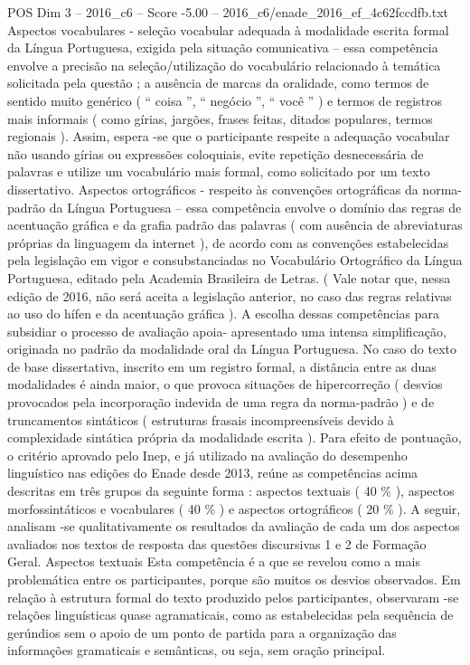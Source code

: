 \begin{textsample}{POS Dim 3 – 2016\_c6 – Score -5.00 – 2016\_c6/enade\_2016\_ef\_4c62fccdfb.txt}
Aspectos vocabulares - seleção vocabular adequada à modalidade escrita formal da Língua Portuguesa, exigida pela situação comunicativa – essa competência envolve a precisão na seleção/utilização do vocabulário relacionado à temática solicitada pela questão ; a ausência de marcas da oralidade, como termos de sentido muito genérico ( “ coisa ”, “ negócio ”, “ você ” ) e termos de registros mais informais ( como gírias, jargões, frases feitas, ditados populares, termos regionais ).
Assim, espera -se que o participante respeite a adequação vocabular não usando gírias ou expressões coloquiais, evite repetição desnecessária de palavras e utilize um vocabulário mais formal, como solicitado por um texto dissertativo.
Aspectos ortográficos - respeito às convenções ortográficas da norma-padrão da Língua Portuguesa – essa competência envolve o domínio das regras de acentuação gráfica e da grafia padrão das palavras ( com ausência de abreviaturas próprias da linguagem da internet ), de acordo com as convenções estabelecidas pela legislação em vigor e consubstanciadas no Vocabulário Ortográfico da Língua Portuguesa, editado pela Academia Brasileira de Letras. ( Vale notar que, nessa edição de 2016, não será aceita a legislação anterior, no caso das regras relativas ao uso do hífen e da acentuação gráfica ).
A escolha dessas competências para subsidiar o processo de avaliação apoia- apresentado uma intensa simplificação, originada no padrão da modalidade oral da Língua Portuguesa.
No caso do texto de base dissertativa, inscrito em um registro formal, a distância entre as duas modalidades é ainda maior, o que provoca situações de hipercorreção ( desvios provocados pela incorporação indevida de uma regra da norma-padrão ) e de truncamentos sintáticos ( estruturas frasais incompreensíveis devido à complexidade sintática própria da modalidade escrita ).
Para efeito de pontuação, o critério aprovado pelo Inep, e já utilizado na avaliação do desempenho linguístico nas edições do Enade desde 2013, reúne as competências acima descritas em três grupos da seguinte forma : aspectos textuais ( 40 \% ), aspectos morfossintáticos e vocabulares ( 40 \% ) e aspectos ortográficos ( 20 \% ).
A seguir, analisam -se qualitativamente os resultados da avaliação de cada um dos aspectos avaliados nos textos de resposta das questões discursivas 1 e 2 de Formação Geral.
Aspectos textuais Esta competência é a que se revelou como a mais problemática entre os participantes, porque são muitos os desvios observados.
Em relação à estrutura formal do texto produzido pelos participantes, observaram -se relações linguísticas quase agramaticais, como as estabelecidas pela sequência de gerúndios sem o apoio de um ponto de partida para a organização das informações gramaticais e semânticas, ou seja, sem oração principal.

\end{textsample}
